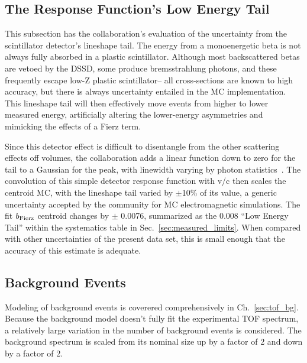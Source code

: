 \FloatBarrier
\subsection{The Response Function's Low Energy Tail}

This subsection has the collaboration's evaluation of the uncertainty from
the scintillator detector's lineshape tail.
The energy from a monoenergetic beta is not always fully absorbed
in a plastic scintillator.
Although most backscattered betas are vetoed by the DSSD,
some produce bremsstrahlung photons,
and these frequently escape low-Z plastic scintillator-- all cross-sections
are known to high accuracy, but there is always uncertainty entailed in  the
MC implementation.
This lineshape tail will then effectively move events from higher to lower measured
energy, artificially altering the lower-energy asymmetries and mimicking the effects of a
Fierz term.

Since this detector effect is difficult to disentangle from the other scattering
effects off volumes,
the collaboration adds a linear function down to zero for the tail to
a Gaussian for the peak,
with linewidth varying by photon statistics~\cite{clifford}.
The convolution of this simple detector response function with v/c then scales the
centroid MC, with the lineshape tail varied by $\pm$10\% of its value,
a generic uncertainty accepted by the community for MC electromagnetic simulations.
The fit $b_{\rm Fierz}$ centroid changes by $\pm$ 0.0076, summarized
as the 0.008 ``Low Energy Tail'' within the systematics table in Sec.~\ref{sec:measured_limits}.
When compared with other uncertainties of the present data set,
this is small enough that the accuracy of this estimate is adequate.

\subsection{Background Events}
\label{section:background_events_systematics}
Modeling of background events is coverered comprehensively in Ch.~\ref{sec:tof_bg}.  Because the background model doesn't fully fit the experimental TOF spectrum, a relatively large variation in the number of background events is considered.  The background spectrum is scaled from its nominal size up by a factor of 2 and down by a factor of 2.  

